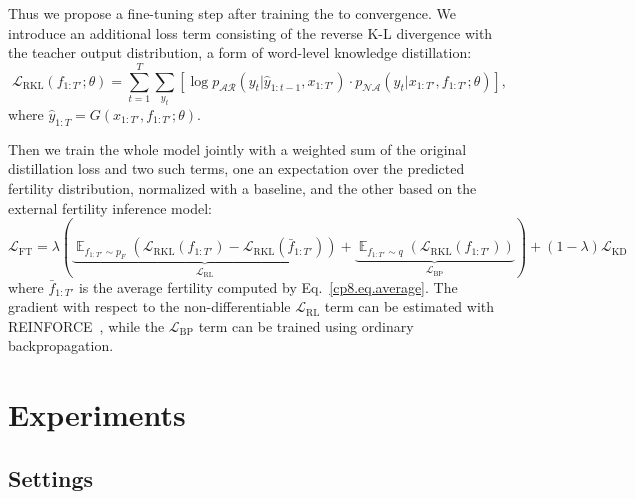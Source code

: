Thus we propose a fine-tuning step after training the \model{} to convergence. We introduce an additional loss term consisting of the reverse K-L divergence with the teacher output distribution, a form of word-level knowledge distillation:
\begin{equation}
\mathcal{L}_\text{RKL}\left(f_{1:T'}; \theta \right)=  \sum_{t=1}^T\sum_{y_t}\left[\log p_{\mathcal{AR}}\left(y_t|\hat{y}_{1:t-1}, x_{1:T'}\right)\cdot p_{\mathcal{NA}}\left(y_t|x_{1:T'}, f_{1:T'}; \theta \right)\right],
\label{cp8.eq.soft-conceptual}
\end{equation}
where $\hat{y}_{1:T}=G(x_{1:T'}, f_{1:T'};\theta)$. %

Then we train the whole model jointly with a weighted sum of the original distillation loss and two such terms, one an expectation over the predicted fertility distribution, normalized with a baseline, and the other based on the external fertility inference model:
\begin{equation}
\mathcal{L}_\text{FT} = \lambda \left(\underbrace{\mathop{\mathbb{E}}_{f_{1:T'} \sim p_F}\left(\mathcal{L}_\text{RKL}\left(f_{1:T'}\right) - \mathcal{L}_\text{RKL}\left(\bar{f}_{1:T'}\right)\right)}_{\mathcal{L}_\text{RL}} + \underbrace{\mathop{\mathbb{E}}_{f_{1:T'} \sim q}\left(\mathcal{L}_\text{RKL}\left(f_{1:T'}\right)\right)}_{\mathcal{L}_\text{BP}}\right) + (1 - \lambda)\mathcal{L}_\text{KD}
\end{equation}
where $\bar{f}_{1:T'}$ is the average fertility computed by Eq.~\eqref{cp8.eq.average}.
The gradient with respect to the non-differentiable $\mathcal{L}_\text{RL}$ term can be estimated with REINFORCE~\citep{williams1992simple}, while the $\mathcal{L}_\text{BP}$ term can be trained using ordinary backpropagation.


\section{Experiments}
\subsection{Settings}
